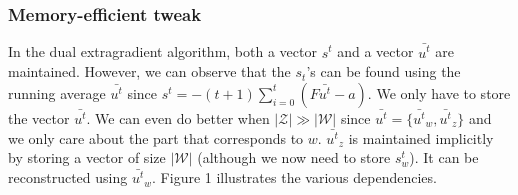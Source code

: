 \subsubsection{Memory-efficient tweak}
In the dual extragradient algorithm, both a vector $s^t$ and a vector
$\bar{u^t}$ are maintained. However, we can observe that the $s_t$'s can be
found using the running average $\bar{u^t}$ since $s^t = -(t + 1 ) \sum_{i=0}^t
(F \bar{u^t} - a)$. We only have to store the vector $\bar{u^t}$. We can even do
better when $|\mathcal{Z}| \gg |\mathcal{W}|$ since $\bar{u^t} = \{
\bar{u^t}_w,\bar{u^t}_z \}$ and we only care about the part that corresponds to
$w$. $\bar{u^t}_z$ is maintained implicitly by storing a vector of size
$|\mathcal{W}|$ (although we now need to store $s_w^t$). It can be reconstructed
using $\bar{u^t}_w$. Figure 1 illustrates the various dependencies.



